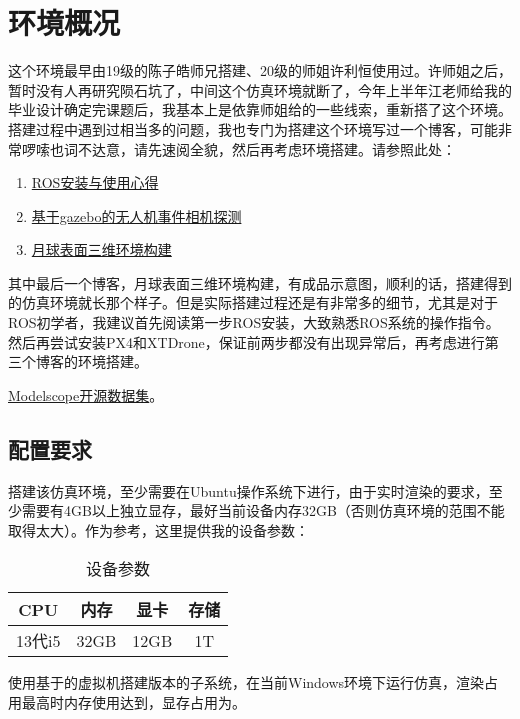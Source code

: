 \documentclass{article}
\begin{document}
\section{环境概况}
这个环境最早由19级的陈子皓师兄搭建\cite{chenCraterDetectionRecognition2021}、20级的师姐许利恒使用过\cite{linLunarCraterDetection2022}。许师姐之后，暂时没有人再研究陨石坑了，中间这个仿真环境就断了，今年上半年江老师给我的毕业设计确定完课题后，我基本上是依靠师姐给的一些线索，重新搭了这个环境。搭建过程中遇到过相当多的问题，我也专门为搭建这个环境写过一个博客，可能非常啰嗦也词不达意，请先速阅全貌，然后再考虑环境搭建。请参照此处：
\begin{enumerate}
  \item \href{https://bugbubbles.github.io/2024/04/%E9%99%A8%E7%9F%B3%E5%9D%91/ros%E5%AE%89%E8%A3%85%E4%B8%8E%E4%BD%BF%E7%94%A8%E5%BF%83%E5%BE%97/}{ROS安装与使用心得}
  \item \href{https://bugbubbles.github.io/2024/04/%E9%99%A8%E7%9F%B3%E5%9D%91/%E5%9F%BA%E4%BA%8Egazebo%E7%9A%84%E6%97%A0%E4%BA%BA%E6%9C%BA%E4%BA%8B%E4%BB%B6%E7%9B%B8%E6%9C%BA%E6%8E%A2%E6%B5%8B/}{基于gazebo的无人机事件相机探测}
  \item \href{https://bugbubbles.github.io/2024/04/%E9%99%A8%E7%9F%B3%E5%9D%91/%E6%9C%88%E7%90%83%E8%A1%A8%E9%9D%A2%E4%B8%89%E7%BB%B4%E7%8E%AF%E5%A2%83%E6%9E%84%E5%BB%BA/}{月球表面三维环境构建}
\end{enumerate}\par
其中最后一个博客，月球表面三维环境构建，有成品示意图，顺利的话，搭建得到的仿真环境就长那个样子。但是实际搭建过程还是有非常多的细节，尤其是对于ROS初学者，我建议首先阅读第一步ROS安装，大致熟悉ROS系统的操作指令。然后再尝试安装PX4和XTDrone，保证前两步都没有出现异常后，再考虑进行第三个博客的环境搭建。\par
{}\href{https://www.modelscope.cn/datasets/BugBubbles/KaguyaLORC}{Modelscope开源数据集}。
\subsection{配置要求}
搭建该仿真环境，至少需要在Ubuntu操作系统下进行，由于实时渲染的要求，至少需要有4GB以上独立显存，最好当前设备内存32GB（否则仿真环境的范围不能取得太大）。作为参考，这里提供我的设备参数：
\begin{table}[H]
  \caption{设备参数}
  \centering
  \begin{tabular}{cccc}
    \toprule
    CPU & 内存 & 显卡& 存储\\
    \hline
     13代i5 &32GB      & 12GB   & 1T \\
    \bottomrule
  \end{tabular}
  \label{tab:device}
\end{table}
使用基于的虚拟机搭建版本的子系统，在当前Windows环境下运行仿真，渲染占用最高时内存使用达到，显存占用为。
\end{document}
